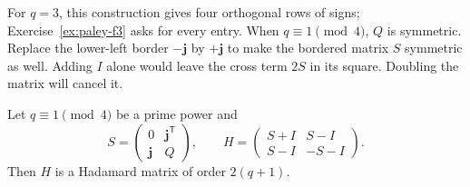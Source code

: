 For $q=3$, this construction gives four orthogonal rows of signs;
Exercise~\ref{ex:paley-f3} asks for every entry. When $q\equiv1\pmod4$,
$Q$ is symmetric. Replace the lower-left border $-\mathbf j$ by
$+\mathbf j$ to make the bordered matrix $S$ symmetric as well. Adding
$I$ alone would leave the cross term $2S$ in its square. Doubling the
matrix will cancel it.

\begin{theorem}[Paley II, 1933]\label{conjectures:thm:paley2}
Let $q\equiv1\pmod4$ be a prime power and
\[
S=\begin{pmatrix}0&\mathbf j^{\mathsf T}\\\mathbf j&Q\end{pmatrix},\qquad H=\begin{pmatrix}S+I&S-I\\S-I&-S-I\end{pmatrix}.
\]
Then $H$ is a Hadamard matrix of order $2(q+1)$.
\end{theorem}
